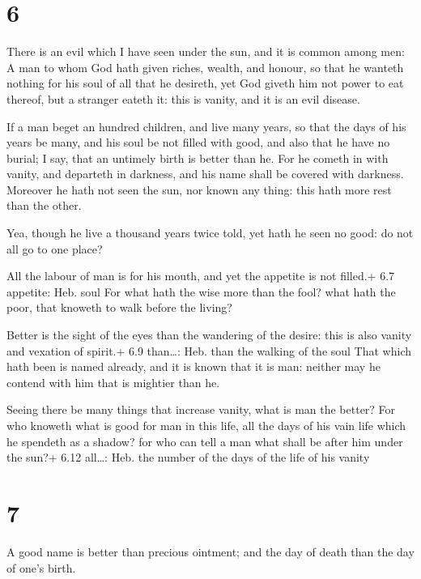 \hypertarget{section-5}{%
\section{6}\label{section-5}}

 There is an evil which I have seen under the sun, and it is
common among men:  A man to whom God hath given riches,
wealth, and honour, so that he wanteth nothing for his soul of all that
he desireth, yet God giveth him not power to eat thereof, but a stranger
eateth it: this is vanity, and it is an evil disease.

 If a man beget an hundred children, and live many years,
so that the days of his years be many, and his soul be not filled with
good, and also that he have no burial; I say, that an untimely birth is
better than he.  For he cometh in with vanity, and departeth
in darkness, and his name shall be covered with darkness. 
Moreover he hath not seen the sun, nor known any thing: this hath more
rest than the other.

 Yea, though he live a thousand years twice told, yet hath
he seen no good: do not all go to one place?

 All the labour of man is for his mouth, and yet the
appetite is not filled.+ 6.7 appetite: Heb. soul  For what
hath the wise more than the fool? what hath the poor, that knoweth to
walk before the living?

 Better is the sight of the eyes than the wandering of the
desire: this is also vanity and vexation of spirit.+ 6.9 than\ldots:
Heb. than the walking of the soul  That which hath been is
named already, and it is known that it is man: neither may he contend
with him that is mightier than he.

 Seeing there be many things that increase vanity, what
is man the better?  For who knoweth what is good for man in
this life, all the days of his vain life which he spendeth as a shadow?
for who can tell a man what shall be after him under the sun?+ 6.12
all\ldots: Heb. the number of the days of the life of his vanity

\hypertarget{section-6}{%
\section{7}\label{section-6}}

 A good name is better than precious ointment; and the day
of death than the day of one's birth.

